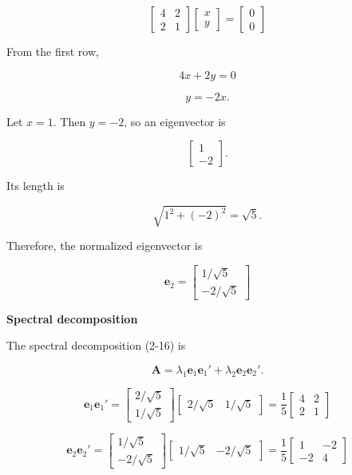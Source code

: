 \documentclass[12pt]{article}
\begin{document}
$$
\begin{bmatrix}
4 & 2\\
2 & 1
\end{bmatrix}
\begin{bmatrix}
x\\
y
\end{bmatrix}
=
\begin{bmatrix}
0\\
0
\end{bmatrix}
$$

\noindent From the first row,

$$
4x+2y=0
$$

$$
y=-2x.
$$

\noindent Let $x=1$. Then $y=-2$, so an eigenvector is

$$
\begin{bmatrix}
1\\
-2
\end{bmatrix}.
$$

\noindent Its length is

$$
\sqrt{1^2+(-2)^2}=\sqrt{5}.
$$

\noindent Therefore, the normalized eigenvector is

$$
\boxed{
\mathbf{e}_2=
\begin{bmatrix}
1/\sqrt{5}\\
-2/\sqrt{5}
\end{bmatrix}
}
$$

\vspace{1em}

\noindent \textbf{Spectral decomposition}

\noindent The spectral decomposition (2-16) is

$$
\mathbf{A} = \lambda_1 \mathbf{e}_1 \mathbf{e}_1' + \lambda_2 \mathbf{e}_2 \mathbf{e}_2'.
$$

$$
\mathbf{e}_1\mathbf{e}_1' =
\begin{bmatrix} 2/\sqrt5 \\ 1/\sqrt5 \end{bmatrix}
\begin{bmatrix} 2/\sqrt5 & 1/\sqrt5 \end{bmatrix}
=
\frac{1}{5}\begin{bmatrix} 4 & 2 \\ 2 & 1 \end{bmatrix}
$$

$$
\mathbf{e}_2\mathbf{e}_2' =
\begin{bmatrix} 1/\sqrt5 \\ -2/\sqrt5 \end{bmatrix}
\begin{bmatrix} 1/\sqrt5 & -2/\sqrt5 \end{bmatrix}
=
\frac{1}{5}\begin{bmatrix} 1 & -2 \\ -2 & 4 \end{bmatrix}
$$
\end{document}
